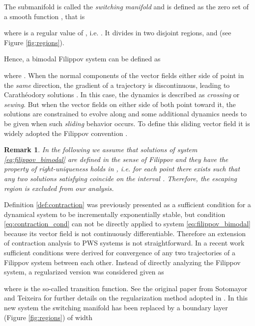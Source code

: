 \documentclass[letterpaper, 10 pt, conference]{ieeeconf}
\newtheorem{remark}{Remark}
\begin{document}
The submanifold  is called the \emph{switching manifold} and is defined as the zero set of a smooth function , that is

where  is a regular value of , i.e. . It divides  in two disjoint regions,  and  (see Figure \ref{fig:regions}).

Hence, a bimodal Filippov system can be defined as

where .  When the normal components of the vector fields either side of  point in the \textit{same} direction, the gradient of a trajectory is discontinuous, leading to Carath\'eodory solutions \cite{filippov1988differential}. In this case, the dynamics is described as \textit{crossing} or \textit{sewing}. But when the vector fields on either side of  both point toward it, the solutions are constrained to evolve along  and some additional dynamics needs to be given when such \emph{sliding} behavior occurs. To define this sliding vector field it is widely adopted the Filippov convention \cite{filippov1988differential}. 
\begin{remark}
In the following we assume that solutions of system \eqref{eq:filippov_bimodal} are defined in the sense of Filippov \cite{filippov1988differential} and they have the property of \emph{right-uniqueness} \cite[pag. 106]{filippov1988differential} holds in , i.e. for each point  there exists  such that any two solutions satisfying  coincide on the interval . Therefore, the escaping region is excluded from our analysis. 
\end{remark}

Definition \ref{def:contraction} was previously presented as a sufficient condition for a dynamical system to be incrementally exponentially stable, but  condition \eqref{eq:contraction_cond} can not be directly applied to system \eqref{eq:filippov_bimodal} because its vector field is not continuously differentiable. Therefore an extension of contraction analysis to PWS systems is not straightforward. In a recent work \cite{fiore2015contraction} sufficient conditions were derived for convergence of any two trajectories of a Filippov system between each other. Instead of directly analyzing the Filippov system, a regularized version  was considered given as

where  is the so-called transition function. See the original paper \cite{sotomayor1996regularization} from Sotomayor and Teixeira for further details on the regularization method adopted in \cite{fiore2015contraction}. 
In this new system the switching manifold  has been replaced by a boundary layer  (Figure \ref{fig:regions}) of width 
\end{document}
